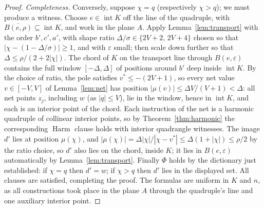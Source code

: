 \documentclass[10pt,a4paper]{amsart}
\newcommand{\Harm}{\operatorname{Harm}}
\newcommand{\interior}{\operatorname{int}}
\begin{document}
\begin{proof}
\emph{Completeness.} Conversely, suppose $\chi=q$ \textup(respectively
$\chi>q$\textup); we must produce a witness. Choose $e\in\interior K$ off the
line of the quadruple, with $\overline{B(e,\rho)}\subseteq\interior K$, and
work in the plane $A$. Apply Lemma~\ref{lem:transport} with the order
$b',c',a'$, with shape ratio $\Delta/\sigma\in\{2V+2,\,2V+4\}$ chosen so
that $|\chi-(1-\Delta/\sigma)|\ge1$, and with $\varepsilon$ small; then
scale down further so that $\Delta\le\rho/(2+2|\chi|)$. The chord of $K$
on the transport line through $B(e,\varepsilon)$ contains the full window
$[-\Delta,\Delta]$ of positions around $b'$ deep inside $\interior K$. By the
choice of ratio, the pole satisfies $v^{*}\le-(2V+1)$, so every net value
$v\in[-V,V]$ of Lemma~\ref{lem:net} has position
$|\mu(v)|\le\Delta V/(V+1)<\Delta$: all net points $z_j$, including $w$
\textup(as $|q|\le V$\textup), lie in the window, hence in $\interior K$,
and each is an interior point of the chord. Each instruction of the net is a
harmonic quadruple of collinear interior points, so by
Theorem~\ref{thm:harmonic} the corresponding $\Harm$ clause holds with
interior quadrangle witnesses. The image $d'$ lies at position $\mu(\chi)$,
and $|\mu(\chi)|=\Delta|\chi|/|\chi-v^{*}|\le\Delta(1+|\chi|)\le\rho/2$
by the ratio choice, so $d'$ also lies on the chord, inside $K$; it lies in
$B(e,\varepsilon)$ automatically by Lemma~\ref{lem:transport}. Finally
$\Phi$ holds by the dictionary just established: if $\chi=q$ then
$d'=w$; if $\chi>q$ then $d'$ lies in the displayed set. All clauses are
satisfied, completing the proof. The formulas are uniform in $K$ and $n$,
as all constructions took place in the plane $A$ through the quadruple's
line and one auxiliary interior point.
\end{proof}
\end{document}
